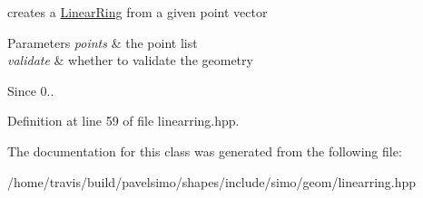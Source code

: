 creates a \hyperlink{classsimo_1_1shapes_1_1_linear_ring}{Linear\-Ring} from a given point vector 


\begin{DoxyParams}{Parameters}
{\em points} & the point list \\
\hline
{\em validate} & whether to validate the geometry\\
\hline
\end{DoxyParams}
\begin{DoxySince}{Since}
0.. 
\end{DoxySince}


Definition at line 59 of file linearring.\-hpp.



The documentation for this class was generated from the following file\-:\begin{DoxyCompactItemize}
\item 
/home/travis/build/pavelsimo/shapes/include/simo/geom/linearring.\-hpp\end{DoxyCompactItemize}
